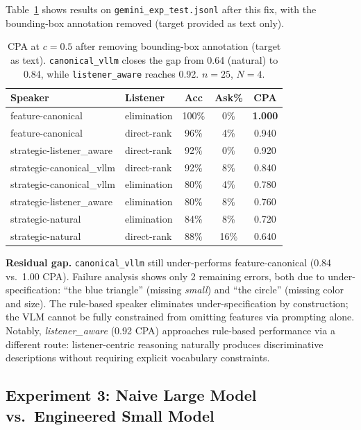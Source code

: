 \documentclass[11pt]{article}
\begin{document}
Table~\ref{tab:canonical_gap} shows results on \texttt{gemini\_exp\_test.jsonl}
after this fix, with the bounding-box annotation removed (target provided as text only).

\begin{table}[h]
\centering
\small
\begin{tabular}{llccc}
\toprule
Speaker & Listener & Acc & Ask\% & CPA \\
\midrule
feature-canonical              & elimination  & 100\% &  0\% & \textbf{1.000} \\
feature-canonical              & direct-rank  &  96\% &  4\% & 0.940 \\
strategic-listener\_aware      & direct-rank  &  92\% &  0\% & 0.920 \\
strategic-canonical\_vllm      & direct-rank  &  92\% &  8\% & 0.840 \\
strategic-canonical\_vllm      & elimination  &  80\% &  4\% & 0.780 \\
strategic-listener\_aware      & elimination  &  80\% &  8\% & 0.760 \\
strategic-natural              & elimination  &  84\% &  8\% & 0.720 \\
strategic-natural              & direct-rank  &  88\% & 16\% & 0.640 \\
\bottomrule
\end{tabular}
\caption{CPA at $c{=}0.5$ after removing bounding-box annotation (target as text).
         \texttt{canonical\_vllm} closes the gap from 0.64 (natural) to 0.84,
         while \texttt{listener\_aware} reaches 0.92.  $n{=}25$, $N{=}4$.}
\label{tab:canonical_gap}
\end{table}

\textbf{Residual gap.}
\texttt{canonical\_vllm} still under-performs feature-canonical (0.84 vs.\ 1.00 CPA).
Failure analysis shows only 2 remaining errors, both due to under-specification:
``the blue triangle'' (missing \textit{small}) and ``the circle'' (missing color
and size).  The rule-based speaker eliminates under-specification by construction;
the VLM cannot be fully constrained from omitting features via prompting alone.
Notably, \textit{listener\_aware} (0.92 CPA) approaches rule-based performance via
a different route: listener-centric reasoning naturally produces discriminative
descriptions without requiring explicit vocabulary constraints.

\subsection{Experiment 3: Naive Large Model vs.\ Engineered Small Model}
\label{sec:exp3}
\end{document}
